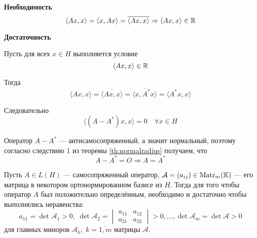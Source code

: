 \begin{proofbreak}
    \dindent \textbf{Необходимость} 
    \[ \left< Ax, x\right> = \left< x, Ax\right> = \overline{\left<
    Ax, x\right>} \Rightarrow \left< Ax, x\right> \in \mathbb{R} \]

    \textbf{Достаточность}

    Пусть для всех $x \in H$ выполняется условие
    \[ \left< Ax, x\right> \in \mathbb{R} \]

    Тогда
    \[ \langle Ax, x\rangle = \overline{\langle Ax, x\rangle} =
    \overline{\langle x, A^*x\rangle} = \langle A^*x, x\rangle \]

    Следовательно
    \[ \langle (A - A^*)x, x\rangle = 0 \quad \forall x \in H \]

    Оператор $A - A^*$ --- антисамосопряженный, а значит нормальный, поэтому 
    согласно следствию 1 из теоремы \ref{th:normalradius} получаем, что
    \[ A - A^* = O \Rightarrow A = A^* \]
\end{proofbreak}

\begin{theorem}\label{th:sylvestercriterion}
    Пусть $A\in L(H)$ --- самосопряженный оператор, $\mathcal{A} = (a_{ij}) \in
    \mathrm{Matr}_{m}({\mathbb{K}})$ --- его матрица в некотором ортонормированном базисе из $H$. Тогда
    для того чтобы оператор $A$ был положительно определённым, необходимо и
    достаточно чтобы выполнялись неравенства:
    \[ a_{11} = \det \mathcal{A}_1 > 0, \; \det \mathcal{A}_2 = \begin{vmatrix}
            a_{11} & a_{12}\\
            a_{21} & a_{22}
    \end{vmatrix} > 0, \dotsc, \det \mathcal{A}_m = \det \mathcal{A} > 0 \]
    для главных миноров $\mathcal{A}_k, \; k = \overline{1, m}$ матрицы
    $\mathcal{A}$.
\end{theorem}

